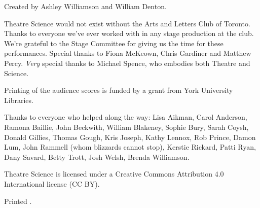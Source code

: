 Created by Ashley Williamson and William Denton.

Theatre Science would not exist without the Arts and Letters Club of Toronto.  Thanks to everyone we've ever worked with in any stage production at the club.  We're grateful to the Stage Committee for giving us the time for these performances. Special thanks to Fiona McKeown, Chris Gardiner and Matthew Percy.  \textit{Very} special thanks to Michael Spence, who embodies both Theatre and Science.

Printing of the audience scores is funded by a grant from York University Libraries.

Thanks to everyone who helped along the way:  Lisa Aikman, Carol Anderson, Ramona Baillie, John Beckwith, William Blakeney, Sophie Bury, Sarah Coysh, Donald Gillies, Thomas Gough, Kris Joseph, Kathy Lennox, Rob Prince, Damon Lum, John Rammell (whom blizzards cannot stop), Kerstie Rickard, Patti Ryan, Dany Savard, Betty Trott, Josh Welsh, Brenda Williamson.

Theatre Science is licensed under a Creative Commons Attribution 4.0 International license (CC BY).  %

\vfill

{\small Printed \DTMnow.}
